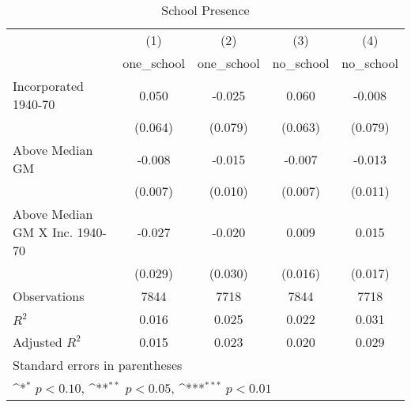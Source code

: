 \begin{table}[htbp]\centering
\def\sym#1{\ifmmode^{#1}\else\(^{#1}\)\fi}
\caption{School Presence}
\begin{tabular}{l*{4}{c}}
\hline\hline
                    &\multicolumn{1}{c}{(1)}&\multicolumn{1}{c}{(2)}&\multicolumn{1}{c}{(3)}&\multicolumn{1}{c}{(4)}\\
                    &\multicolumn{1}{c}{one\_school}&\multicolumn{1}{c}{one\_school}&\multicolumn{1}{c}{no\_school}&\multicolumn{1}{c}{no\_school}\\
\hline
Incorporated 1940-70&       0.050         &      -0.025         &       0.060         &      -0.008         \\
                    &     (0.064)         &     (0.079)         &     (0.063)         &     (0.079)         \\
[1em]
Above Median GM     &      -0.008         &      -0.015         &      -0.007         &      -0.013         \\
                    &     (0.007)         &     (0.010)         &     (0.007)         &     (0.011)         \\
[1em]
Above Median GM X Inc. 1940-70&      -0.027         &      -0.020         &       0.009         &       0.015         \\
                    &     (0.029)         &     (0.030)         &     (0.016)         &     (0.017)         \\
\hline
Observations        &        7844         &        7718         &        7844         &        7718         \\
\(R^{2}\)           &       0.016         &       0.025         &       0.022         &       0.031         \\
Adjusted \(R^{2}\)  &       0.015         &       0.023         &       0.020         &       0.029         \\
\hline\hline
\multicolumn{5}{l}{\footnotesize Standard errors in parentheses}\\
\multicolumn{5}{l}{\footnotesize \sym{*} \(p<0.10\), \sym{**} \(p<0.05\), \sym{***} \(p<0.01\)}\\
\end{tabular}
\end{table}
